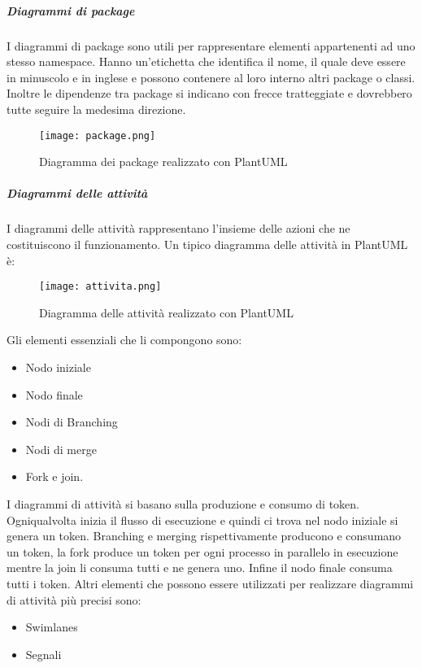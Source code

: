 \documentclass[../../norme-di-progetto.tex]{subfiles}
\begin{document}
\subparagraph{Diagrammi di package}%
\label{subp:diagrammi_di_package}
I diagrammi di package sono utili per rappresentare elementi appartenenti ad uno stesso namespace.
Hanno un'etichetta che identifica il nome, il quale deve essere in minuscolo e in inglese e possono contenere al loro interno altri package o classi.
Inoltre le dipendenze tra package si indicano con frecce tratteggiate e dovrebbero tutte seguire la medesima direzione.
\begin{figure}[H]%
  \label{fig:package}
  \texttt{[image: package.png]}
  \centering
  \caption{Diagramma dei package realizzato con PlantUML}
\end{figure}

\subparagraph{Diagrammi delle attività}%
\label{diagrammi_delle_attivita}%
I diagrammi delle attività rappresentano l'insieme delle azioni che ne costituiscono il funzionamento. Un tipico diagramma delle attività in PlantUML è:
\begin{figure}[H]%
  \label{fig:attività}
  \texttt{[image: attivita.png]}
  \centering
  \caption{Diagramma delle attività realizzato con PlantUML}
\end{figure}
Gli elementi essenziali che li compongono sono:
\begin{itemize}
  \item Nodo iniziale
  \item Nodo finale
  \item Nodi di Branching
  \item Nodi di merge
  \item Fork e join.
\end{itemize}
I diagrammi di attività si basano sulla produzione e consumo di token.
Ogniqualvolta inizia il flusso di esecuzione e quindi ci trova nel nodo iniziale si genera un token.
Branching e merging rispettivamente producono e consumano un token, la fork produce un token per ogni processo in parallelo in esecuzione mentre la join li consuma tutti e ne genera uno.
Infine il nodo finale consuma tutti i token.
Altri elementi che possono essere utilizzati per realizzare diagrammi di attività più precisi sono:
\begin{itemize}
  \item Swimlanes
  \item Segnali
\end{itemize}
\end{document}

